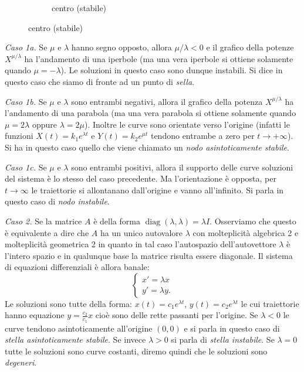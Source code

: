 \documentclass[italian,a4paper]{scrartcl}
\DeclareMathOperator{\diag}{diag}
\begin{document}
\begin{figure}
\begin{subfigure}{5cm}
  \caption{centro (stabile)}
 \end{subfigure}
\end{figure}

\emph{Caso 1a.}
Se $\mu$ e $\lambda$ hanno segno opposto, allora
$\mu/\lambda<0$ e il grafico della potenze $X^{\mu/\lambda}$ ha
l'andamento di una iperbole (ma una vera iperbole si ottiene solamente
quando $\mu=-\lambda$).
Le soluzioni in questo caso sono dunque
instabili.
Si dice in questo caso che siamo di fronte ad un punto di \emph{sella}.

\emph{Caso 1b.}
Se $\mu$ e $\lambda$ sono entrambi negativi, allora il
grafico della potenza $X^{\mu/\lambda}$ ha l'andamento di una parabola
(ma una vera parabola si ottiene solamente quando $\mu=2\lambda$
oppure $\lambda=2 \mu$). Inoltre le curve sono orientate verso
l'origine (infatti le funzioni $X(t)=k_1 e^{\lambda t}$ e $Y(t)=k_2
e^{\mu t}$ tendono entrambe a zero per $t\to +\infty$). Si ha in
questo caso quello che viene chiamato un \emph{nodo asintoticamente
  stabile}.

\emph{Caso 1c.}
Se $\mu$ e $\lambda$ sono entrambi positivi, allora il
supporto delle curve soluzioni del sistema è lo stesso del caso
precedente. Ma l'orientazione è opposta, per $t\to \infty$ le
traiettorie si allontanano dall'origine e vanno all'infinito. Si parla
in questo caso di \emph{nodo instabile}.

\emph{Caso 2.}
Se la matrice $A$ è della forma
$\diag(\lambda,\lambda)=\lambda I$. Osserviamo che questo è equivalente a dire
 che $A$ ha un unico autovalore $\lambda$ con molteplicità algebrica 2 e
molteplicità geometrica 2 in quanto in tal caso l'autospazio
dell'autovettore $\lambda$ è l'intero spazio e in qualunque base la
matrice risulta essere diagonale.
Il sistema di equazioni differenziali è allora banale:
\[
\begin{cases}
 x' = \lambda x\\
 y' = \lambda y.
\end{cases}
\]
Le soluzioni sono tutte della forma: $x(t)=c_1 e^{\lambda t}$,
$y(t)=c_2 e^{\lambda t}$ le cui traiettorie hanno equazione
$y=\frac{c_2}{c_1}x$ cioè sono delle rette passanti per l'origine.
Se $\lambda<0$ le curve tendono asintoticamente all'origine $(0,0)$ e
si parla in questo caso di \emph{stella asintoticamente stabile}.
Se invece $\lambda>0$ si parla di \emph{stella instabile}. Se $\lambda
= 0$ tutte le soluzioni sono curve costanti, diremo quindi che le
soluzioni sono \emph{degeneri}.
\end{document}
